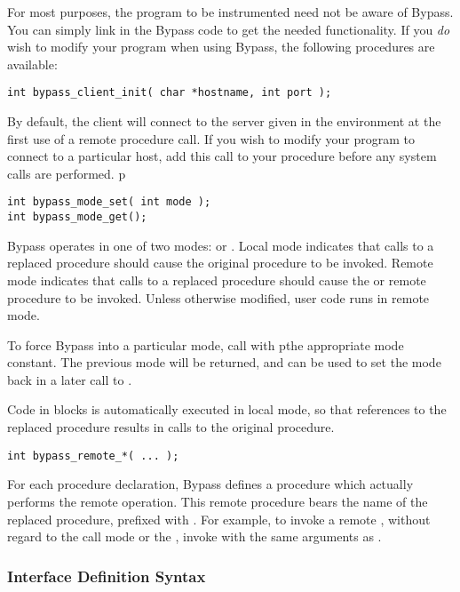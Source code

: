 For most purposes, the program to be instrumented need not be aware of Bypass.  You can simply link in the Bypass code to get the needed functionality.  If you {\em do} wish to modify your program when using Bypass, the following procedures are available:

\begin{verbatim}
int bypass_client_init( char *hostname, int port );
\end{verbatim}

By default, the client will connect to the server given in the environment at the first use of a remote procedure call.  If you wish to modify your program to connect to a particular host, add this call to your  procedure before any system calls are performed.
p
\begin{verbatim}
int bypass_mode_set( int mode );
int bypass_mode_get();
\end{verbatim}

Bypass operates in one of two modes:  or
.  Local mode indicates that calls to a replaced
procedure should cause the original procedure to be invoked.  Remote mode
indicates that calls to a replaced procedure should cause the 
 or remote procedure to be invoked.  Unless otherwise
modified, user code runs in remote mode.

To force Bypass into a particular mode, call  with
pthe appropriate mode constant.  The previous mode will be returned, and
can be used to set the mode back in a later call to .

Code in  blocks is automatically executed in local
mode, so that references to the replaced procedure results in calls to the
original procedure.

\begin{verbatim}
int bypass_remote_*( ... );
\end{verbatim}

For each procedure declaration, Bypass defines a procedure which actually
performs the remote operation.  This remote procedure bears the name of
the replaced procedure, prefixed with .  For example, to
invoke a remote , without regard to the call mode or
the , invoke  with the
same arguments as .

\subsubsection{Interface Definition Syntax}

